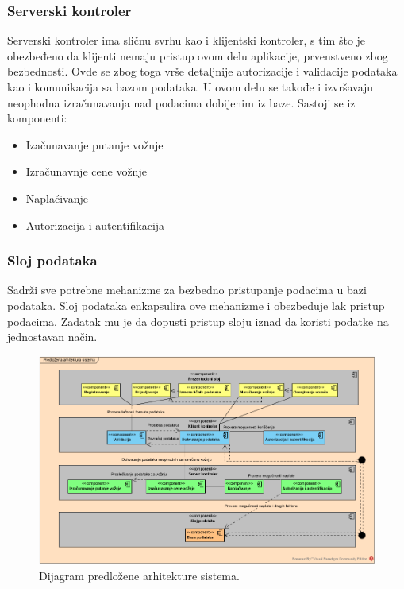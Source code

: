 \subsubsection{\bfseries Serverski kontroler}

Serverski kontroler ima sličnu svrhu kao i klijentski kontroler, s tim što je obezbeđeno da klijenti nemaju pristup ovom delu aplikacije, prvenstveno zbog bezbednosti. Ovde se zbog toga vrše detaljnije autorizacije i validacije podataka kao i komunikacija sa bazom podataka. U ovom delu se takođe i izvršavaju neophodna izračunavanja nad podacima dobijenim iz baze.
\newline
Sastoji se iz komponenti:
\begin{itemize}
    \item Izačunavanje putanje vožnje
    \item Izračunavnje cene vožnje
    \item Naplaćivanje
    \item Autorizacija i autentifikacija
\end{itemize}
\subsubsection{\bfseries Sloj podataka}
Sadrži sve potrebne mehanizme za bezbedno pristupanje podacima u bazi podataka. Sloj podataka enkapsulira ove mehanizme i obezbeđuje lak pristup podacima. Zadatak mu je da dopusti pristup sloju iznad da koristi podatke na jednostavan način.

\begin{figure}[H]
\includegraphics[scale = 0.70]{Slike/Arhitektura.png}
    \caption{Dijagram predložene arhitekture sistema.}
\label{fig:Predložena arhitektura sistema}
\end{figure}

\newpage
